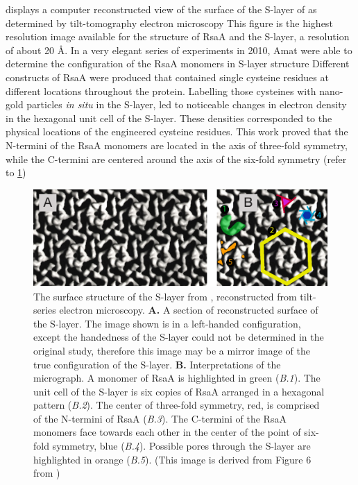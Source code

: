  displays a computer reconstructed view of the surface of the \ac{S-layer} of \caulobacter as determined by tilt-tomography electron
microscopy This figure is the highest resolution image available for the structure of RsaA and the \ac{S-layer}, a resolution of about 20 \AA{}. In a very
elegant series of experiments in 2010, Amat \etal were able to determine the configuration of the RsaA monomers in \ac{S-layer} structure Different constructs
of RsaA were produced that contained single cysteine residues at different locations throughout the protein. Labelling those cysteines with nano-gold particles \textit{in situ} in
the \ac{S-layer}, led to noticeable changes in electron density in the hexagonal unit cell of the \ac{S-layer}. These densities corresponded to the physical locations of the
engineered cysteine residues. This work proved that the N-termini of the RsaA monomers are located in the axis of three-fold symmetry, while the C-termini are centered around the
axis of the six-fold symmetry (refer to \cref{fig:intro-micrograph})

\begin{figure}[htb]
  \begin{center}
    \includegraphics[width=\textwidth]{intro/img/slayermicrograph.pdf}
  \end{center}
  \caption[Reconstructed surface of the \caulobacter \ac{S-layer}]{ The surface structure of the \ac{S-layer} from \caulobacter, reconstructed from tilt-series electron microscopy.
\textbf{A.} A section of reconstructed surface of the \caulobacter \ac{S-layer}. The image shown is in a left-handed configuration, except the handedness of the \ac{S-layer}
could not be determined in the original study, therefore this image may be a mirror image of the true configuration of the \ac{S-layer}. \textbf{B.} Interpretations of the
micrograph. A monomer of RsaA is highlighted in green (\textit{B.1}). The unit cell of the \ac{S-layer} is six copies of RsaA arranged in a hexagonal pattern (\textit{B.2}). The
center of three-fold symmetry, red, is comprised of the N-termini of RsaA (\textit{B.3}). The C-termini of the RsaA monomers face towards each other in the center of the point of
six-fold symmetry, blue (\textit{B.4}). Possible pores through the \ac{S-layer} are highlighted in orange (\textit{B.5}). (This image is derived from Figure 6 from
) }
  \label{fig:intro-micrograph}
\end{figure}

